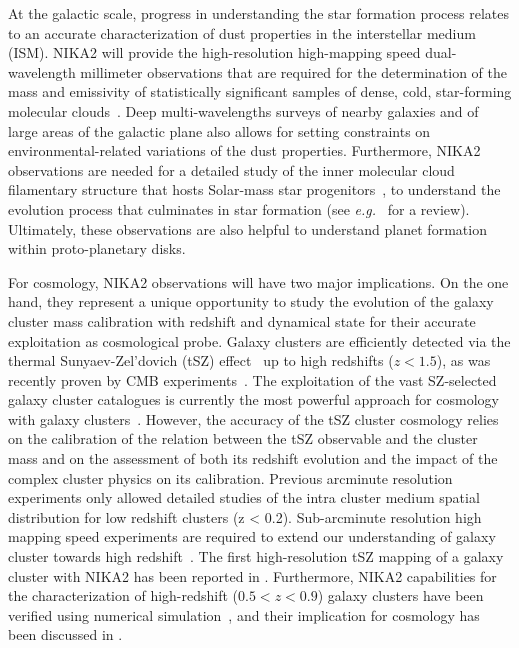 At the galactic scale, progress in understanding the star formation
process relates to an accurate characterization of dust properties in
the interstellar medium (ISM). NIKA2 will provide the high-resolution
high-mapping speed dual-wavelength millimeter observations that are
required for the determination of the mass and emissivity of
statistically significant samples of dense, cold, star-forming
molecular clouds~\citep{Rigby2018}.
Deep multi-wavelengths surveys of nearby galaxies and of large areas
of the galactic plane also allows for setting constraints on
environmental-related variations of the dust properties.
Furthermore, NIKA2 observations are needed for a
detailed study of the inner molecular cloud filamentary structure that
hosts Solar-mass star progenitors~\citep{Bracco2017}, to
understand the evolution process that culminates in star
formation (see \emph{e.g.}~\citet{Andre2014} for a review). Ultimately, these
observations are also helpful to understand planet formation within
proto-planetary disks.

For cosmology, NIKA2 observations will have two major
implications. On the one hand, they represent a unique opportunity to
study the evolution of the galaxy cluster mass calibration with
redshift and {\lp dynamical state} for their accurate exploitation as cosmological probe. 
Galaxy clusters are efficiently detected via the thermal
Sunyaev-Zel'dovich (tSZ) effect~\citep{SZ1970} up to high redshifts {\lp ($z<1.5$)}, as was recently
proven by CMB
experiments~\citep{Hasselfield2013_ACT_SZ, Reichardt2013_SPT_SZ, Planck2016_SZcat}.
The exploitation of the vast SZ-selected galaxy cluster catalogues is
currently the most powerful approach for cosmology with galaxy
clusters~\citep{Planck_2016_SZ_cosmo}. However, the accuracy of the tSZ cluster
cosmology relies on the calibration of the relation between the tSZ
observable and the cluster mass and on the assessment of both its redshift
evolution and the impact of the complex cluster physics on its calibration. 
Previous arcminute resolution experiments only allowed detailed studies
of the intra cluster medium spatial distribution for low redshift clusters (z <
0.2). Sub-arcminute resolution high mapping speed experiments are
required to extend our understanding of galaxy cluster towards high
redshift~\citep{Tony2019}. The first high-resolution
tSZ mapping of a galaxy cluster with NIKA2 has been reported
in \citet{Ruppin2018}. Furthermore, NIKA2 capabilities for the
characterization of high-redshift {\lp ($0.5<z<0.9$)} galaxy clusters
have been verified using numerical simulation~\citep{Ruppin2019}, and
their implication for cosmology has been discussed
in \citet{Ruppin2019b}.


